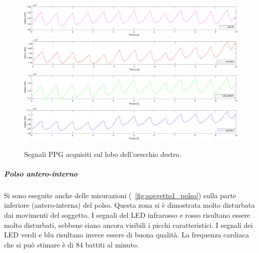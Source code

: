 \begin{figure}[h]
	\centering
	\includegraphics[width=1\linewidth]{ImageFiles/Misure Preliminari/Soggetto 1/lobo_ired}
	\includegraphics[width=1\linewidth]{ImageFiles/Misure Preliminari/Soggetto 1/lobo_red}
	\includegraphics[width=1\linewidth]{ImageFiles/Misure Preliminari/Soggetto 1/lobo_green}
	\includegraphics[width=1\linewidth]{ImageFiles/Misure Preliminari/Soggetto 1/lobo_blu}
	\caption{Segnali PPG acquisiti sul lobo dell'orecchio destro.}
	\label{fig:soggetto1_lobo}
\end{figure}

\clearpage

\subparagraph{Polso antero-interno}

Si sono eseguite anche delle misurazioni (\Fig~\ref{fig:soggetto1_polso}) sulla parte inferiore (antero-interna) del polso. Questa zona si è dimostrata molto disturbata dai movimenti del soggetto. I segnali del LED infrarosso e rosso risultano essere molto disturbati, sebbene siano ancora visibili i picchi caratteristici. I segnali dei LED verdi e blu risultano invece essere di buona qualità. La frequenza cardiaca che si può stimare è di 84 battiti al minuto. 

